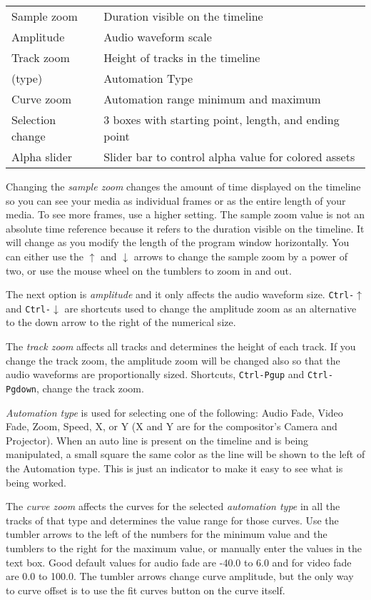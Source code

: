 \vspace{2ex}
\begin{tabular}{ll}
   \hline
	Sample zoom & Duration visible on the timeline \\
	Amplitude & Audio waveform scale \\
	Track zoom & Height of tracks in the timeline \\
	  (type) & Automation Type \\
	Curve zoom & Automation range minimum and maximum \\
	Selection change & 3 boxes with starting point, length, and ending point \\
	Alpha slider & Slider bar to control alpha value for colored assets \\
   \hline
\end{tabular}

Changing the \emph{sample zoom} changes the amount of time displayed on the timeline 
so you can see your media as individual frames or as the entire length of your media. 
To see more frames, use a higher setting. 
The sample zoom value is not an absolute time reference because it refers to the duration visible on the timeline. It will change as you modify the length of the program window horizontally.
You can either use the $\uparrow$ and $\downarrow$ arrows to change the sample zoom by a power of two, or use the mouse wheel on the tumblers to zoom in and out.


The next option is \emph{amplitude} and it only affects the audio waveform size. \texttt{Ctrl-$\uparrow$} and \texttt{Ctrl-$\downarrow$} are shortcuts used to change the amplitude zoom as an alternative to the down arrow to the right of the numerical size.

The \emph{track zoom} affects all tracks and determines the height of each track. 
If you change the track zoom, the amplitude zoom will be changed also so that the audio waveforms
are proportionally sized.
Shortcuts, \texttt{Ctrl-Pgup} and \texttt{Ctrl-Pgdown}, change the track zoom.

\emph{Automation type} is used for selecting one of the following: Audio Fade, Video Fade, Zoom, Speed, X, or Y (X and Y are for the compositor's Camera and Projector).  When an auto line is present on
the timeline and is being manipulated, a small square the same color as the line will be shown to 
the left of the Automation type.  This is just an indicator to make it easy to see what is being worked.
 
The \emph{curve zoom} affects the curves for the selected \emph{automation type} in all the tracks of that type and determines the value range for those curves. 
Use the tumbler arrows to the left of the numbers for the minimum value and the tumblers to the right for the maximum value, or manually enter the values in the text box. 
Good default values for audio fade are -40.0 to 6.0 and for video fade are 0.0 to 100.0. 
The tumbler arrows change curve amplitude, but the only way to curve offset is to use the fit curves button on the curve itself.

